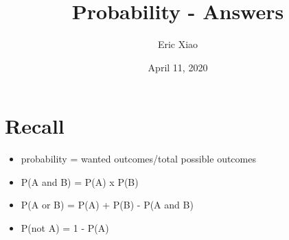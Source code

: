 \documentclass[12pt]{extarticle}
\title{Probability - Answers}
\author{Eric Xiao}
\date{April 11, 2020}
\begin{document}
\maketitle

\section{Recall}
\begin{itemize}
    \itemsep 1.0em
    \item {probability = wanted outcomes/total possible outcomes}
    \item {P(A and B) = P(A) x P(B)}
    \item {P(A or B) = P(A) + P(B) - P(A and B)}
    \item {P(not A) = 1 - P(A)}
\end{itemize}
\end{document}
